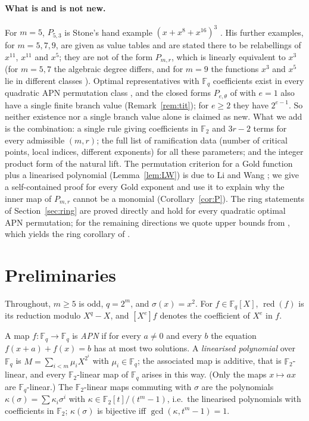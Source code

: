 \documentclass[preprint,12pt]{elsarticle}
\theoremstyle{definition}
\newcommand{\F}{\mathbb{F}}
\newcommand{\red}{\operatorname{red}}
\begin{document}
\paragraph{What is and is not new.} For $m=5$, $P_{5,3}$ is Stone's hand example $(x+x^8+x^{16})^3$ \cite{Stone}. His further examples, for $m=5,7,9$, are given as value tables and are stated there to be relabellings of $x^{11}$, $x^{11}$ and $x^{5}$; they are not of the form $P_{m,r}$, which is linearly equivalent to $x^3$ (for $m=5,7$ the algebraic degree differs, and for $m=9$ the functions $x^3$ and $x^5$ lie in different classes \cite[Table~1]{YKBL}). Optimal representatives with $\F_q$ coefficients exist in every quadratic APN permutation class \cite{TIT}, and the closed forms $P_{e,\theta}$ of \cite[App.~A]{TIT} with $e=1$ also have a single finite branch value (Remark~\ref{rem:tit}); for $e\ge2$ they have $2^{e-1}$. So neither existence nor a single branch value alone is claimed as new. What we add is the combination: a single rule giving coefficients in $\F_2$ and $3r-2$ terms for every admissible $(m,r)$; the full list of ramification data (number of critical points, local indices, different exponents) for all these parameters; and the integer product form of the natural lift. The permutation criterion for a Gold function plus a linearised polynomial (Lemma~\ref{lem:LW}) is due to Li and Wang \cite[Thm.~4]{LW}; we give a self-contained proof for every Gold exponent and use it to explain why the inner map of $P_{m,r}$ cannot be a monomial (Corollary~\ref{cor:P}). The ring statements of Section~\ref{sec:ring} are proved directly and hold for every quadratic optimal APN permutation; for the remaining directions we quote upper bounds from \cite{RS}, which yields the ring corollary of \cite{TIT}.

\section{Preliminaries}
Throughout, $m\ge5$ is odd, $q=2^m$, and $\sigma(x)=x^2$. For $f\in\F_q[X]$, $\red(f)$ is its reduction modulo $X^q-X$, and $[X^e]f$ denotes the coefficient of $X^e$ in $f$.

A map $f:\F_q\to\F_q$ is \emph{APN} if for every $a\neq0$ and every $b$ the equation $f(x+a)+f(x)=b$ has at most two solutions. A \emph{linearised polynomial} over $\F_q$ is $M=\sum_{i<m}\mu_iX^{2^i}$ with $\mu_i\in\F_q$; the associated map is additive, that is $\F_2$-linear, and every $\F_2$-linear map of $\F_q$ arises in this way. (Only the maps $x\mapsto ax$ are $\F_q$-linear.) The $\F_2$-linear maps commuting with $\sigma$ are the polynomials $\kappa(\sigma)=\sum\kappa_i\sigma^i$ with $\kappa\in\F_2[t]/(t^m-1)$, i.e.\ the linearised polynomials with coefficients in $\F_2$; $\kappa(\sigma)$ is bijective iff $\gcd(\kappa,t^m-1)=1$.
\end{document}
